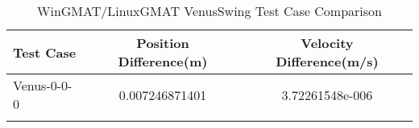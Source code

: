 \begin{table}[htbp!]
\centering
\caption{ WinGMAT/LinuxGMAT VenusSwing Test Case Comparison}
      \begin{tabular}{lcc}
      \hline\hline
          Test Case & Position Difference(m) & Velocity Difference(m/s) \\
         \hline
         Venus-0-0-0 & 0.007246871401 & 3.72261548e-006 \\
      \hline\hline
      \label{Table: VenusSwing WinGMAT-LinuxGMAT Table} 
\end{tabular}
\end{table}
